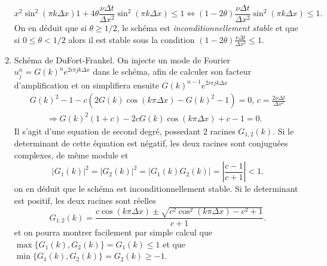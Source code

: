 \documentclass[12pt,a4paper]{article}
\begin{document}
\begin{enumerate}
$${{    x^2}\sin^2(\pi k\Delta x)}{1+4\theta \displaystyle\frac{\nu\Delta
    t}{\Delta x^2}\sin^2(\pi k\Delta x)}\le 1 \Leftrightarrow (1-2\theta) \displaystyle\frac{\nu\Delta
    t}{\Delta x^2}\sin^2(\pi k\Delta x)\le 1.
$$
On en d\'eduit que si $\theta \ge 1/2$, le sch\'ema est
{\it inconditionnellement stable} et que si $0\le \theta < 1/2$ alors il est
stable sous la condition $(1-2\theta)\frac{\nu\Delta
    t}{\Delta x^2} \le 1$.
\item Sch\'ema de DuFort-Frankel. On injecte un mode de Fourier
  $u_j^n=G(k)^ne^{2i\pi j k\Delta x}$ dans le sch\'ema, afin de calculer
  son facteur d'amplification et on simplifiera ensuite $G(k)^{n-1}e^{2i\pi jk\Delta x}$
$$
\begin{array}{l}
G(k)^2-1-c\left(2G(k)\cos(k\pi\Delta
  x)-G(k)^2-1\right)=0,\, c=\frac{2\nu\Delta t}{\Delta x^2}\\[2ex]
\qquad \Rightarrow G(k)^2(1+c)-2cG(k)\cos(k\pi\Delta x)+c-1=0.
\end{array}
$$
Il s'agit d'une equation de second degr\'e, possedant $2$ racines
$G_{1,2}(k)$. Si le determinant de cette \'equation est n\'egatif, les
deux racines sont conjugu\'ees complexes, de m\^eme module et 
$$
|G_1(k)|^2= |G_2(k)|^2=|G_1(k)G_2(k)|=\left|\frac{c-1}{c+1}\right|<1.
$$
on en d\'eduit que le sch\'ema est inconditionnellement stable. Si le
determinant est positif, les deux racines sont r\'eelles
$$
G_{1,2}(k)=\frac{c\cos(k\pi\Delta x)\pm \sqrt{c^2\cos^2(k\pi\Delta x)-c^2+1} }{c+1}.
$$
et on pourra montrer facilement par simple calcul que $\max
\{G_1(k),G_2(k)\} = G_1(k) \le  1$ et que $\min
\{G_1(k),G_2(k)\} = G_2(k) \ge -1$.
\end{enumerate}
\end{document}
